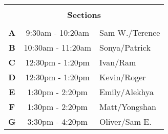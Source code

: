 \documentclass[11pt,addpoints]{exam}
\begin{document}
\begin{center}
 \vspace{0.3in}

 \begin{tabular}{c c l}
  \hline \\ [-1.5ex]
  \multicolumn{3}{c}{ \bf Sections }\\ [1ex]
  \hline \\ [-1ex]

  \textbf{A} & 9:30am - 10:20am & Sam W./Terence\\
  \textbf{B} & 10:30am - 11:20am & Sonya/Patrick\\
  \textbf{C} & 12:30pm - 1:20pm & Ivan/Ram\\
  \textbf{D} & 12:30pm - 1:20pm & Kevin/Roger\\
  \textbf{E} & 1:30pm - 2:20pm & Emily/Alekhya\\
  \textbf{F} & 1:30pm - 2:20pm & Matt/Yongshan\\
  \textbf{G} & 3:30pm - 4:20pm & Oliver/Sam E.\\

  \hline
  \end{tabular}
\end{center}

\newpage

\vspace*{1in}
\begin{center}
  \gradetable[v][questions]
\end{center}

\newpage




\begin{questions}


\newpage


\newpage


\newpage


\newpage


\newpage


\newpage



\end{questions}
\end{document}
